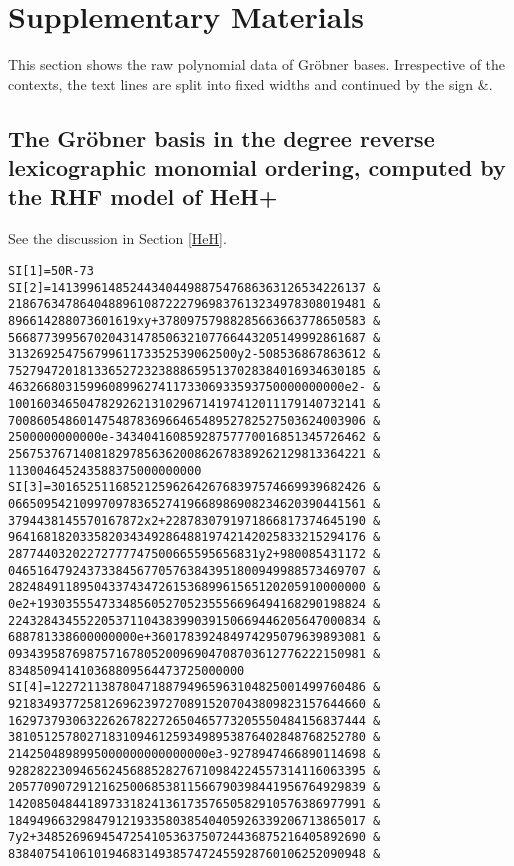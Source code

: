 \section*{ 
Supplementary Materials 
}
This section shows the raw polynomial data of Gr\"obner bases.  Irrespective of the contexts, the text lines are split into fixed widths and continued by the sign \&. 

\subsection*{
The Gr\"obner basis in the degree reverse lexicographic monomial ordering, computed by the RHF model of HeH+
}
See the discussion in Section \ref{HeH}.
\begin{verbatim} 
SI[1]=50R-73 
SI[2]=14139961485244340449887547686363126534226137 &
21867634786404889610872227969837613234978308019481 &
896614288073601619xy+37809757988285663663778650583 &
56687739956702043147850632107766443205149992861687 &
31326925475679961173352539062500y2-508536867863612 &
75279472018133652723238886595137028384016934630185 &
46326680315996089962741173306933593750000000000e2- &
10016034650478292621310296714197412011179140732141 &
70086054860147548783696646548952782527503624003906 &
2500000000000e-34340416085928757770016851345726462 &
25675376714081829785636200862678389262129813364221 &
113004645243588375000000000 
SI[3]=30165251168521259626426768397574669939682426 &
06650954210997097836527419668986908234620390441561 &
3794438145570167872x2+2287830791971866817374645190 &
96416818203358203434928648819742142025833215294176 &
28774403202272777747500665595656831y2+980085431172 &
04651647924373384567705763843951800949988573469707 &
28248491189504337434726153689961565120205910000000 &
0e2+1930355547334856052705235556696494168290198824 &
22432843455220537110438399039150669446205647000834 &
688781338600000000e+360178392484974295079639893081 &
09343958769875716780520096904708703612776222150981 &
834850941410368809564473725000000 
SI[4]=12272113878047188794965963104825001499760486 &
92183493772581269623972708915207043809823157644660 &
16297379306322626782272650465773205550484156837444 &
38105125780271831094612593498953876402848768252780 &
2142504898995000000000000000e3-9278947466890114698 &
92828223094656245688528276710984224557314116063395 &
20577090729121625006853811566790398441956764929839 &
14208504844189733182413617357650582910576386977991 &
18494966329847912193358038540405926339206713865017 &
7y2+3485269694547254105363750724436875216405892690 &
83840754106101946831493857472455928760106252090948 &

\end{verbatim}
